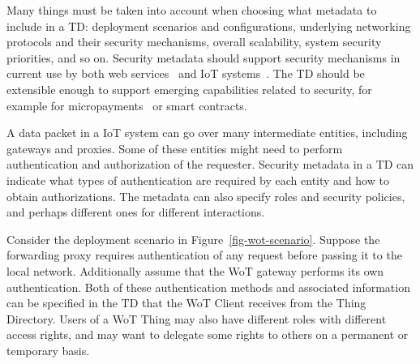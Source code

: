 Many things must be taken into account when choosing what metadata to include in a TD: 
deployment scenarios and configurations, 
underlying networking protocols and their security mechanisms, 
overall scalability, system security priorities, and so on.
Security metadata should support security mechanisms in current use by both 
web services~\cite{openapi2018} and IoT systems~\cite{ace2017,ocf2017}.
The TD should be extensible enough to support emerging capabilities
related to security, for
example for micropayments~\cite{interledger2017} or smart contracts.

A data packet in a IoT system can go over many intermediate entities,
including gateways and proxies.
Some of these entities might need to perform authentication 
and authorization of the requester. 
Security metadata in a TD can indicate
what types of authentication are required by each entity
and how to obtain authorizations.
The metadata can also specify roles and security policies,
and perhaps different ones for different interactions.

Consider the deployment scenario in Figure~\ref{fig-wot-scenario}.
Suppose the forwarding proxy requires authentication of any request before passing it to the local network.
Additionally assume that the WoT gateway performs its own authentication.
Both of these authentication methods and 
associated information can be specified in the TD 
that the WoT Client receives from the Thing Directory.
Users of a WoT Thing may also have different roles with different access rights,
and may want to delegate some rights to others on a permanent or temporary basis.

